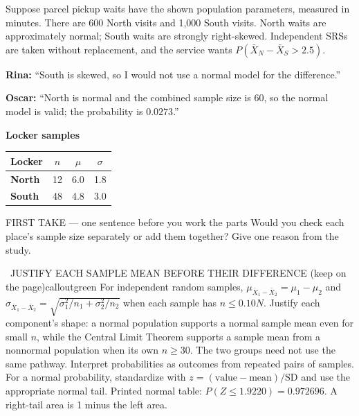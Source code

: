 \documentclass[11pt]{article}
\begin{document}
\clearpage
{}

Suppose parcel pickup waits have the shown population parameters, measured in minutes. There are 600 North visits and 1,000 South visits. North waits are approximately normal; South waits are strongly right-skewed. Independent SRSs are taken without replacement, and the service wants $P(\bar X_N-\bar X_S>2.5)$.\par\smallskip \textbf{Rina:} ``South is skewed, so I would not use a normal model for the difference.''\par \textbf{Oscar:} ``North is normal and the combined sample size is 60, so the normal model is valid; the probability is $0.0273$.''\par
\begin{center}
\textbf{Locker samples}\par\smallskip
\begin{tabular}{|l|c|c|c|}
\hline
\textbf{Locker} & \textbf{$n$} & \textbf{$\mu$} & \textbf{$\sigma$} \\ \hline
\textbf{North} & 12 & 6.0 & 1.8 \\ \hline
\textbf{South} & 48 & 4.8 & 3.0 \\ \hline
\end{tabular}
\end{center}
\begin{firsttakebox}{FIRST TAKE --- one sentence before you work the parts}
Would you check each place's sample size separately or add them together? Give one reason from the study.\par
{}
\end{firsttakebox}

\begin{callout}{\IconBook\ JUSTIFY EACH SAMPLE MEAN BEFORE THEIR DIFFERENCE (keep on the page)}{calloutgreen}
For independent random samples, $\mu_{\bar X_1-\bar X_2}=\mu_1-\mu_2$ and
$\sigma_{\bar X_1-\bar X_2}=\sqrt{\sigma_1^2/n_1+\sigma_2^2/n_2}$ when each
sample has $n\leq0.10N$. Justify each component's shape: a normal population
supports a normal sample mean even for small $n$, while the Central Limit Theorem supports
a sample mean from a nonnormal population when its own $n\geq30$. The two groups need not
use the same pathway. Interpret probabilities as outcomes from repeated pairs of samples.
For a normal probability, standardize with $z=(\text{value}-\text{mean})/\text{SD}$ and use the appropriate normal tail.
Printed normal table: $P(Z\leq1.9220)=0.972696$. A right-tail area is 1 minus the left area.
\end{callout}
\end{document}
